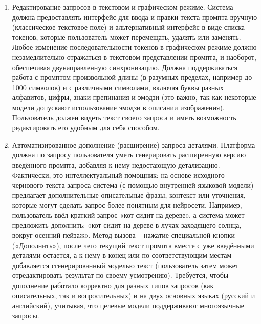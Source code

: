 \begin{enumerate}[label=\arabic*.]
    \item Редактирование запросов в текстовом и графическом режиме. Система должна предоставлять интерфейс для ввода и правки текста промпта вручную (классическое текстовое поле) и альтернативный интерфейс в виде списка токенов, которые пользователь может перемещать, удалять или заменять. Любое изменение последовательности токенов в графическом режиме должно незамедлительно отражаться в текстовом представлении промпта, и наоборот, обеспечивая двунаправленную синхронизацию. Должна поддерживаться работа с промптом произвольной длины (в разумных пределах, например до 1000 символов) и с различными символами, включая буквы разных алфавитов, цифры, знаки препинания и эмодзи (это важно, так как некоторые модели допускают использование эмодзи в описании изображения)\cite{fusionbrain:docs}. Пользователь должен видеть текст своего запроса и иметь возможность редактировать его удобным для себя способом.
    \item Автоматизированное дополнение (расширение) запроса деталями. Платформа должна по запросу пользователя уметь генерировать расширенную версию введённого промпта, добавляя к нему недостающую детализацию. Фактически, это интеллектуальный помощник: на основе исходного чернового текста запроса система (с помощью внутренней языковой модели) предлагает дополнительные описательные фразы, контекст или уточнения, которые могут сделать запрос более понятным для нейросети. Например, пользователь ввёл краткий запрос «кот сидит на дереве», а система может предложить дополнить: «кот сидит на дереве в лучах заходящего солнца, вокруг осенний пейзаж». Метод вызова – нажатие специальной кнопки («Дополнить»), после чего текущий текст промпта вместе с уже введёнными деталями остается, а к нему в конец или по соответствующим местам добавляется сгенерированный моделью текст (пользователь затем может отредактировать результат по своему усмотрению). Требуется, чтобы дополнение работало корректно для разных типов запросов (как описательных, так и вопросительных) и на двух основных языках (русский и английский), учитывая, что целевые модели поддерживают многоязычные запросы.

\end{enumerate}
